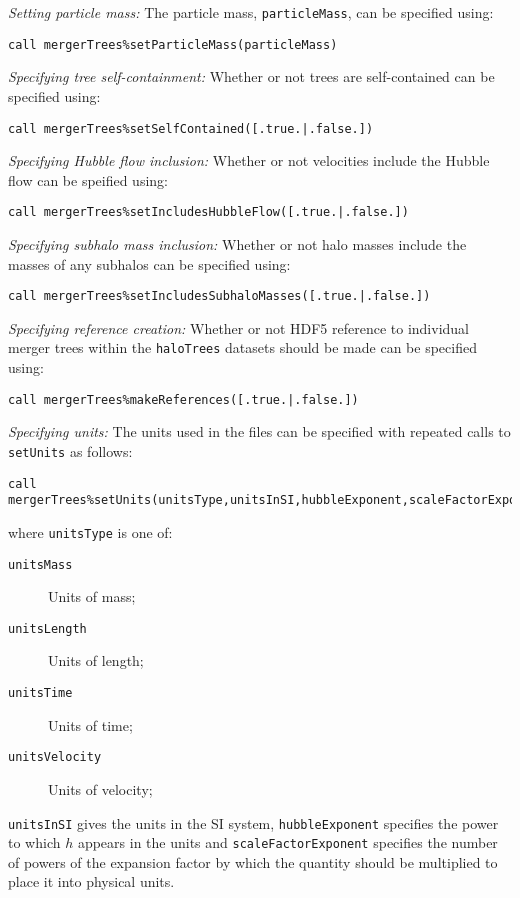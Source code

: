 \noindent \emph{Setting particle mass:} The particle mass, {\tt particleMass}, can be specified using:
\begin{verbatim}
call mergerTrees%setParticleMass(particleMass)
\end{verbatim}

\noindent \emph{Specifying tree self-containment:} Whether or not trees are self-contained can be specified using:
\begin{verbatim}
call mergerTrees%setSelfContained([.true.|.false.])
\end{verbatim}

\noindent \emph{Specifying Hubble flow inclusion:} Whether or not velocities include the Hubble flow can be speified using:
\begin{verbatim}
call mergerTrees%setIncludesHubbleFlow([.true.|.false.])
\end{verbatim}

\noindent \emph{Specifying subhalo mass inclusion:} Whether or not halo masses include the masses of any subhalos can be specified using:
\begin{verbatim}
call mergerTrees%setIncludesSubhaloMasses([.true.|.false.])
\end{verbatim}

\noindent \emph{Specifying reference creation:} Whether or not HDF5 reference to individual merger trees within the {\tt haloTrees} datasets should be made can be specified using:
\begin{verbatim}
call mergerTrees%makeReferences([.true.|.false.])
\end{verbatim}

\noindent \emph{Specifying units:} The units used in the files can be specified with repeated calls to {\tt setUnits} as follows:
\begin{verbatim}
call mergerTrees%setUnits(unitsType,unitsInSI,hubbleExponent,scaleFactorExponent)
\end{verbatim}
where {\tt unitsType} is one of:
\begin{description}
 \item [{\tt unitsMass}] Units of mass;
 \item [{\tt unitsLength}] Units of length;
 \item [{\tt unitsTime}] Units of time;
 \item [{\tt unitsVelocity}] Units of velocity;
\end{description}
{\tt unitsInSI} gives the units in the SI system, {\tt hubbleExponent} specifies the power to which $h$ appears in the units and {\tt scaleFactorExponent} specifies the number of powers of the expansion factor by which the quantity should be multiplied to place it into physical units.\\

